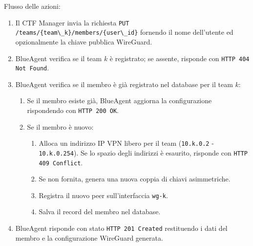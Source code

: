Flusso delle azioni:

\begin{enumerate}
\def\labelenumi{\arabic{enumi}.}
\tightlist
\item
  Il CTF Manager invia la richiesta
  \passthrough{\lstinline!PUT /teams/\{team\_k\}/members/\{user\_id\}!}
  fornendo il nome dell'utente ed opzionalmente la chiave pubblica
  WireGuard.
\item
  BlueAgent verifica se il team \(k\) è registrato; se assente, risponde
  con \passthrough{\lstinline!HTTP 404 Not Found!}.
\item
  BlueAgent verifica se il membro è già registrato nel database per il
  team \(k\):

  \begin{enumerate}
  \def\labelenumii{\arabic{enumii}.}
  \tightlist
  \item
    Se il membro esiste già, BlueAgent aggiorna la configurazione
    rispondendo con \passthrough{\lstinline!HTTP 200 OK!}.
  \item
    Se il membro è nuovo:

    \begin{enumerate}
    \def\labelenumiii{\arabic{enumiii}.}
    \tightlist
    \item
      Alloca un indirizzo IP VPN libero per il team
      (\passthrough{\lstinline!10.k.0.2!} -
      \passthrough{\lstinline!10.k.0.254!}). Se lo spazio degli
      indirizzi è esaurito, risponde con
      \passthrough{\lstinline!HTTP 409 Conflict!}.
    \item
      Se non fornita, genera una nuova coppia di chiavi asimmetriche.
    \item
      Registra il nuovo peer sull'interfaccia
      \passthrough{\lstinline!wg-k!}.
    \item
      Salva il record del membro nel database.
    \end{enumerate}
  \end{enumerate}
\item
  BlueAgent risponde con stato
  \passthrough{\lstinline!HTTP 201 Created!} restituendo i dati del
  membro e la configurazione WireGuard generata.
\end{enumerate}
